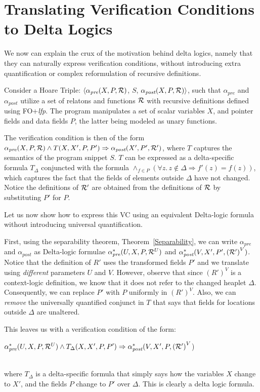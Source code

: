 	\section{Translating Verification Conditions to Delta Logics}
	
	We now can explain the crux of the motivation behind delta logics, namely that they can naturally express verification conditions,
	without introducing extra quantification or complex reformulation of recursive definitions.
	
Consider a Hoare Triple: $\langle \alpha_{\textit{pre}}(X, P, {\cal R})$, $S$, $\alpha_{\textit{post}}(X, P, {\cal R})\rangle$,
such that $\alpha_{pre}$ and $\alpha_{post}$ 
utilize a set of relatons and functions ${\cal R}$  with recursive definitions defined using FO+\textit{lfp}. 
The program manipulates a set of scalar variables $X$, and pointer fields and data fields $P$, the latter being modeled as unary functions. 

The verification condition is then of the form $\alpha_{\textit{pre}}(X, P, {\cal R}) \land{} T(X, X', P, P') \Rightarrow 
\alpha_{\textit{post}} (X', P', {\cal R'})$, where $T$ captures the semantics of the program snippet $S$.
$T$ can be expressed as a delta-specific formula $T_\Delta$ conjuncted with the formula 
$\wedge_{f \in{} P} \left(\forall{}z.\,z\notin{}\Delta{} \Rightarrow f'(z) = f(z) \right)$, which captures
the fact that the fields of elements outside $\Delta$ have not changed. Notice the definitions of ${\cal R'}$ are 
obtained from the definitions of ${\cal R}$ by substituting $P'$ for $P$.

Let us now show how to express this VC using an equivalent Delta-logic formula without introducing universal quantification.

First, using the separability theorem, Theorem~\ref{Separability}, we can write $\alpha_{\textit{pre}}$ and $\alpha_{\textit{post}}$
as Delta-logic formulae $\alpha_{\textit{pre}}^*(U, X, P, {\cal R}^U)$ and $\alpha_{\textit{post}}^*(V, X', P', {\cal (R')}^V)$.
Notice that the definition of $R'$ uses the transformed fields $P'$ and we translate using \emph{different} parameters $U$
and $V$. However, observe that since $(R')^V$ is a context-logic definition, we know that it does not refer to the changed heaplet
$\Delta$. Consequently, we can replace $P'$ with $P$ uniformly in $(R')^V$. Also, we can \emph{remove} the universally
quantified conjunct in $T$ that says that fields for locations outside $\Delta$ are unaltered.

This leaves us with a verification condition of the form:\\
\centerline{ $\alpha_{\textit{pre}}^*(U, X, P, {\cal R}^U) \wedge 
T_\Delta(X, X', P, P') \Rightarrow \alpha_{\textit{post}}^*(V, X', P, {\cal (R')}^V$)}\\
where $T_\Delta$ is a
delta-specific formula that simply says how the variables $X$ change to $X'$, and the fields $P$ change to $P'$ over $\Delta$.
This is clearly a delta logic formula.

